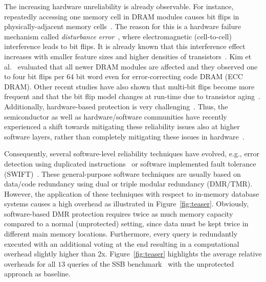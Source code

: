 The increasing hardware unreliability is already observable. For instance, repeatedly accessing one memory cell in DRAM modules causes bit flips in physi\-cally-adjacent memory cells~\cite{DBLP:conf/isca/KimDKFLLWLM14,DBLP:conf/date/Mutlu17}. The reason for this is a hardware failure mechanism called \emph{disturbance error}~\cite{DBLP:conf/isca/KimDKFLLWLM14,DBLP:conf/date/Mutlu17}, where electromagnetic (cell-to-cell) interference leads to bit flips. It is already known that this interference effect increases with smaller feature sizes and higher densities of transistors~\cite{DBLP:conf/isca/KimDKFLLWLM14,DBLP:conf/date/Mutlu17}. Kim et al.~\cite{DBLP:conf/isca/KimDKFLLWLM14} evaluated that all newer DRAM modules are affected and they observed one to four bit flips per $64$ bit word even for error-correcting code DRAM (ECC DRAM). Other recent studies have also shown that multi-bit flips become more frequent and that the bit flip model changes at run-time due to transistor aging~\cite{DBLP:conf/isca/KimDKFLLWLM14,DBLP:books/daglib/0037372}. Additionally, hardware-based protection is very challenging~\cite{DBLP:conf/dac/HenkelBDGNSTW13,DBLP:books/daglib/0037372,DBLP:journals/it/ShafiqueABCCDEH15}. Thus, the semiconductor as well as hardware/software communities have recently experienced a shift towards mitigating these reliability issues also at higher software layers, rather than completely mitigating these issues in hardware~\cite{DBLP:conf/dac/HenkelBDGNSTW13,DBLP:books/daglib/0037372}.

Consequently, several software-level reliability techniques have evolved, e.g., error detection using duplicated instructions~\cite{oh2002error} or software implemented fault tolerance (SWIFT)~\cite{DBLP:conf/cgo/ReisCVRA05}. These general-purpose software techniques are usually based on data/code redundancy using dual or triple modular redundancy (DMR/TMR). However, the application of these techniques with respect to in-memory database systems causes a high overhead as illustrated in Figure~\ref{fig:teaser}. Obviously, software-based DMR protection requires twice as much memory capacity compared to a normal (unprotected) setting, since data must be kept twice in different main memory locations. Furthermore, every query is redundantly executed with an additional voting at the end resulting in a computational overhead slightly higher than 2x. Figure~\ref{fig:teaser} highlights the average relative overheads for all $13$ queries of the SSB benchmark~\cite{oneil2009ssbm,DBLP:journals/corr/Sanchez16a} with the unprotected approach as baseline.

